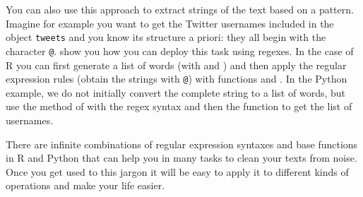 You can also use this approach to extract strings of the text based on a pattern. Imagine for example you want to get the Twitter usernames included in the object \texttt{tweets} and you know its structure a priori: they all begin with the character \texttt{@}.  show you how you can deploy this task using regexes. In the case of R you can first generate a list of words (with  and ) and then apply the regular expression rules (obtain the strings with \texttt{@}) with functions  and . In the Python example, we do not initially convert the complete string to a list of words, but use the  method of  with the regex syntax and then the function  to get the list of usernames.


There are infinite combinations of regular expression syntaxes and base functions in R and Python that can help you in many tasks to clean your texts from noise. Once you get used to this jargon it will be easy to apply it to different kinds of operations and make your life easier.
